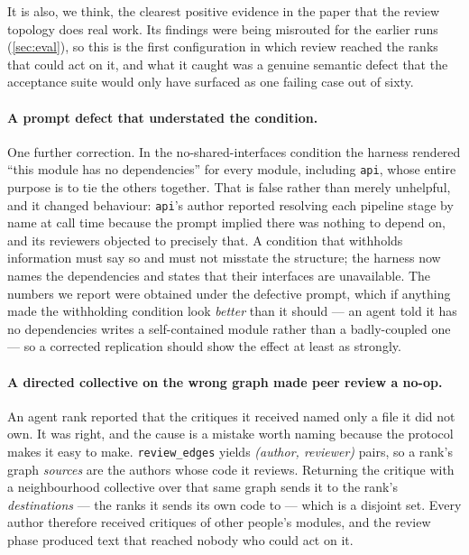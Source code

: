 \documentclass[10pt,twocolumn]{article}
\theoremstyle{definition}
\theoremstyle{plain}
\newcommand{\code}[1]{\texttt{\small #1}}
\begin{document}
It is also, we think, the clearest positive evidence in the paper that the review
topology does real work. Its findings were being misrouted for the earlier runs
(\cref{sec:eval}), so this is the first configuration in which review reached the ranks
that could act on it, and what it caught was a genuine semantic defect that the
acceptance suite would only have surfaced as one failing case out of sixty.

\paragraph{A prompt defect that understated the condition.} One further correction. In
the no-shared-interfaces condition the harness rendered ``this module has no
dependencies'' for every module, including \code{api}, whose entire purpose is to tie
the others together. That is false rather than merely unhelpful, and it changed
behaviour: \code{api}'s author reported resolving each pipeline stage by name at call
time because the prompt implied there was nothing to depend on, and its reviewers
objected to precisely that. A condition that withholds information must say so and must
not misstate the structure; the harness now names the dependencies and states that their
interfaces are unavailable. The numbers we report were obtained under the defective
prompt, which if anything made the withholding condition look \emph{better} than it
should --- an agent told it has no dependencies writes a self-contained module rather
than a badly-coupled one --- so a corrected replication should show the effect at least
as strongly.

\paragraph{A directed collective on the wrong graph made peer review a no-op.} An
agent rank reported that the critiques it received named only a file it did not own.
It was right, and the cause is a mistake worth naming because the protocol makes it
easy to make. \code{review\_edges} yields \emph{(author, reviewer)} pairs, so a rank's
graph \emph{sources} are the authors whose code it reviews. Returning the critique with
a neighbourhood collective over that same graph sends it to the rank's
\emph{destinations} --- the ranks it sends its own code to --- which is a disjoint set.
Every author therefore received critiques of other people's modules, and the review
phase produced text that reached nobody who could act on it.
\end{document}
